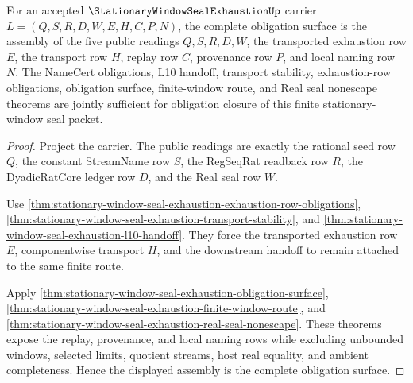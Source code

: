 \begin{theorem}
\label{thm:stationary-window-seal-exhaustion-obligation-closure-assembly}
For an accepted $\StationaryWindowSealExhaustionUp$ carrier $L=(Q,S,R,D,W,E,H,C,P,N)$, the complete obligation surface is the assembly of the five public readings $Q,S,R,D,W$, the transported exhaustion row $E$, the transport row $H$, replay row $C$, provenance row $P$, and local naming row $N$. The NameCert obligations, L10 handoff, transport stability, exhaustion-row obligations, obligation surface, finite-window route, and Real seal nonescape theorems are jointly sufficient for obligation closure of this finite stationary-window seal packet.
\end{theorem}
\begin{proof}
Project the carrier. The public readings are exactly the rational seed row $Q$, the constant StreamName row $S$, the RegSeqRat readback row $R$, the DyadicRatCore ledger row $D$, and the Real seal row $W$.

Use \autoref{thm:stationary-window-seal-exhaustion-exhaustion-row-obligations}, \autoref{thm:stationary-window-seal-exhaustion-transport-stability}, and \autoref{thm:stationary-window-seal-exhaustion-l10-handoff}. They force the transported exhaustion row $E$, componentwise transport $H$, and the downstream handoff to remain attached to the same finite route.

Apply \autoref{thm:stationary-window-seal-exhaustion-obligation-surface}, \autoref{thm:stationary-window-seal-exhaustion-finite-window-route}, and \autoref{thm:stationary-window-seal-exhaustion-real-seal-nonescape}. These theorems expose the replay, provenance, and local naming rows while excluding unbounded windows, selected limits, quotient streams, host real equality, and ambient completeness. Hence the displayed assembly is the complete obligation surface.
\end{proof}




